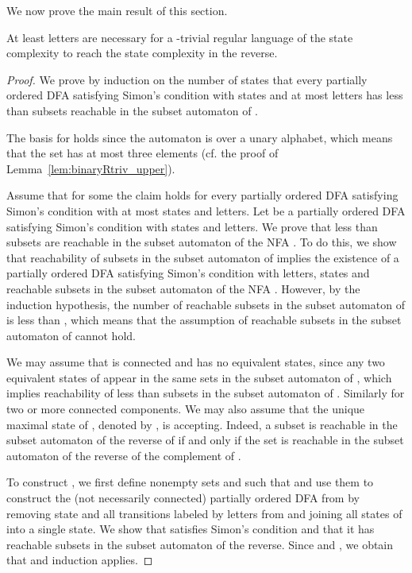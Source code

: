 \documentclass[runningheads]{llncs}
\newcommand{\J}{}
\begin{document}
  We now prove the main result of this section.
  \begin{theorem}\label{thm:boundJtriv}
    At least  letters are necessary for a \J-trivial regular language of the state complexity  to reach the state complexity  in the reverse.
  \end{theorem}
  \begin{proof}
    We prove by induction on the number of states
    that every partially ordered DFA  satisfying Simon's condition with  states and at most  letters
    has less than  subsets reachable in the subset automaton of . 
 
    The basis for  holds since the automaton is over a unary alphabet, 
which means that the set  has at most three elements (cf. the proof of Lemma~\ref{lem:binaryRtriv_upper}).
    
    Assume that for some  the claim holds for every partially ordered DFA satisfying Simon's condition with at most  states and  letters. Let  be a partially ordered DFA satisfying Simon's condition with  states and  letters. We prove that less than  subsets are reachable in the subset automaton of the NFA . To do this, we show that reachability of  subsets in the subset automaton of  implies the existence of a partially ordered DFA  satisfying Simon's condition with  letters,  states and  reachable subsets in the subset automaton of the NFA . However, by the induction hypothesis, the number of reachable subsets in the subset automaton of  is less than , which means that the assumption of  reachable subsets in the subset automaton of  cannot hold.
    
    We may assume that  is connected and has no equivalent states, since any two equivalent states of  appear in the same sets in the subset automaton of , which implies reachability of less than  subsets in the subset automaton of . Similarly for two or more connected components. We may also assume that the unique maximal state of , denoted by , is accepting. Indeed, a subset  is reachable in the subset automaton of the reverse of  if and only if the set  is reachable in the subset automaton of the reverse of the complement of .
    
    To construct , we first define nonempty sets  and  such that  and use them to construct the (not necessarily connected) partially ordered DFA  from  by removing state  and all transitions labeled by letters from  and joining all states of  into a single state. We show that  satisfies Simon's condition and that it has  reachable subsets in the subset automaton of the reverse. Since  and , we obtain that  and induction applies.
    

\end{proof}
\end{document}
